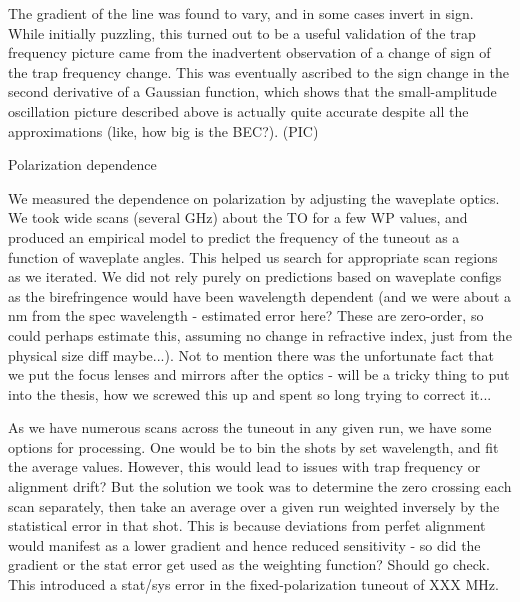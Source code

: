 The gradient of the line was found to vary, and in some cases invert in sign.
	While initially puzzling, this turned out to be a useful validation of the trap frequency picture came from the inadvertent observation of a change of sign of the trap frequency change.
	This was eventually ascribed to the sign change in the second derivative of a Gaussian function, which shows that the small-amplitude oscillation picture described above is actually quite accurate despite all the approximations (like, how big is the BEC?).
	(PIC)


Polarization dependence


We measured the dependence on polarization by adjusting the waveplate optics.
	We took wide scans (several GHz) about the TO for a few WP values, and produced an empirical model to predict the frequency of the tuneout as a function of waveplate angles.
	This helped us search for appropriate scan regions as we iterated.
	We did not rely purely on predictions based on waveplate configs as the birefringence would have been wavelength dependent (and we were about a nm from the spec wavelength - estimated error here? These are zero-order, so could perhaps estimate this, assuming no change in refractive index, just from the physical size diff maybe...).
	Not to mention there was the unfortunate fact that we put the focus lenses and mirrors after the optics - will be a tricky thing to put into the thesis, how we screwed this up and spent so long trying to correct it...
	

As we have numerous scans across the tuneout in any given run, we have some options for processing.
	One would be to bin the shots by set wavelength, and fit the average values.
	However, this would lead to issues with trap frequency or alignment drift? But the solution we took was to determine the zero crossing each scan separately, then take an average over a given run weighted inversely by the statistical error in that shot.
	This is because deviations from perfet alignment would manifest as a lower gradient and hence reduced sensitivity - so did the gradient or the stat error get used as the weighting function? Should go check.
	This introduced a stat/sys error in the fixed-polarization tuneout of XXX MHz.


